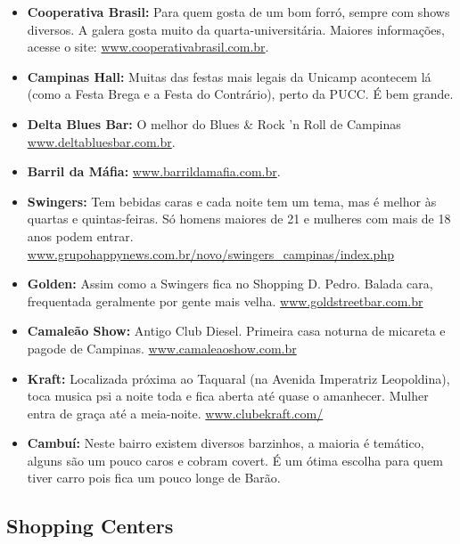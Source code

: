 \begin{itemize}
\item  \textbf{Cooperativa Brasil:} Para quem gosta de um bom forró, sempre com
    shows diversos. A galera gosta muito da quarta-universitária. Maiores
    informações, acesse o site: \url{www.cooperativabrasil.com.br}.

\item  \textbf{Campinas Hall:} Muitas das festas mais legais da Unicamp
    acontecem lá (como a Festa Brega e a Festa do Contrário), perto da PUCC.
    É bem grande.

\item  \textbf{Delta Blues Bar:} O melhor do Blues \& Rock 'n Roll de Campinas
    \url{www.deltabluesbar.com.br}.

\item  \textbf{Barril da Máfia:} \url{www.barrildamafia.com.br}.

\item  \textbf{Swingers:} Tem bebidas caras e cada noite tem um tema, mas
    é melhor às quartas e quintas-feiras. Só homens maiores de 21 e mulheres com
    mais de 18 anos podem entrar.
    \url{www.grupohappynews.com.br/novo/swingers_campinas/index.php}

\item  \textbf{Golden:} Assim como a Swingers fica no Shopping D. Pedro. Balada
    cara, frequentada geralmente por gente mais velha.
    \url{www.goldstreetbar.com.br}

\item  \textbf{Camaleão Show:} Antigo Club Diesel. Primeira casa noturna de
    micareta e pagode de Campinas. \url{www.camaleaoshow.com.br}

\item  \textbf{Kraft:} Localizada próxima ao Taquaral (na Avenida Imperatriz
    Leopoldina), toca musica psi a noite toda e fica aberta até quase
    o amanhecer. Mulher entra de graça até a meia-noite.
    \url{www.clubekraft.com/}

\item  \textbf{Cambuí:} Neste bairro existem diversos barzinhos, a maioria
    é temático, alguns são um pouco caros e cobram covert. É um ótima escolha
    para quem tiver carro pois fica um pouco longe de Barão.

\end{itemize}

\subsection{Shopping Centers}

